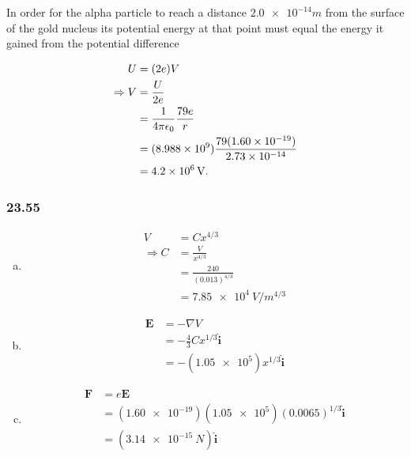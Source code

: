 \documentclass{article}
\begin{document}
In order for the alpha particle to reach a distance $\num{2.0e-14}{m}$ from the surface of the gold nucleus its potential energy at that point must equal the energy it gained from the potential difference

\begin{align*}
  U             & = (2 e) V                                           \\
  \Rightarrow V & = \frac{U}{2 e}                                     \\
                & = \frac{1}{4 \pi \epsilon_0} \frac{79 e}{r}                                \\
                & = (\num{8.988e9}) \frac{79 (\num{1.60e-19})}{\num{2.73e-14}} \\
                & = \qty{4.2e6}{V}.
\end{align*}

\subsubsection{23.55}

\begin{enumerate}[a)]
  \item

        \begin{align*}
          V             & = C x^{4/3}                 \\
          \Rightarrow C & = \frac{V}{x^{4/3}}         \\
                        & = \frac{240}{(0.013)^{4/3}} \\
                        & = \qty{7.85e4}{V/m^{4/3}}
        \end{align*}

  \item
        \begin{align*}
          \mathbf{E} & = -\nabla V                                \\
                     & = -\frac{4}{3} C x^{1/3} \hat{\mathbf{i}}  \\
                     & = -(\num{1.05e5}) x^{1/3} \hat{\mathbf{i}}
        \end{align*}

  \item
        \begin{align*}
          \mathbf{F} & = e \mathbf{E}                                                          \\
                     & = (\num{1.60e-19}) (\num{1.05e5}) (\num{0.0065})^{1/3} \hat{\mathbf{i}} \\
                     & = (\qty{3.14e-15}{N}) \hat{\mathbf{i}}
        \end{align*}
\end{enumerate}
\end{document}
